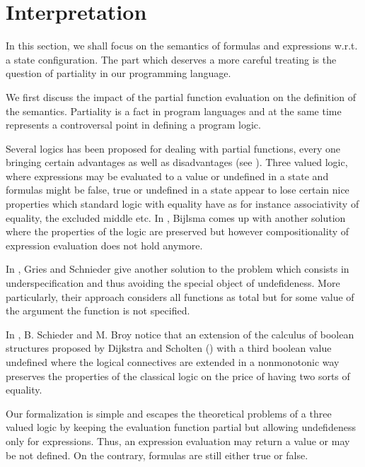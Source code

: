 

\newtheorem{interpExpr}{Definition}[subsection]
\newtheorem{interpTypeExpr}[interpExpr]{Definition} 
\newtheorem{interpPred}[interpExpr]{Definition}


\section{Interpretation}\label{interpret}

In this section, we shall focus on the semantics of formulas and expressions w.r.t. a state configuration.
The part which deserves a more  careful treating is the question of partiality in our programming language.

We first discuss  the impact of the partial function evaluation on the definition of the semantics. 
Partiality is   a  fact  in program languages and at the same time represents a
 controversal point in defining a program logic. 

 Several logics has been proposed for dealing with partial functions, 
every one bringing certain advantages as well as disadvantages (see \cite{gries95avoiding,schieder99adapting}).
Three valued logic, where expressions may be evaluated to a value or  undefined  in a state and
 formulas might be false, true or undefined in a state appear to lose certain nice properties
 which standard logic with equality have
as for instance associativity of equality, the excluded middle \cite{gries95avoiding} etc.
 In \cite{bijlsma90sqb}, Bijlsma comes up with another solution where the  properties of the logic are preserved but 
however compositionality of expression evaluation does not hold anymore.

In \cite{gries95avoiding}, Gries and Schnieder give another solution to the problem which consists in underspecification 
and thus  avoiding the special object of undefideness.
 More particularly, their approach considers all functions as total but for some value of the argument 
the function is not specified. 

In \cite{schieder99adapting},  B. Schieder and M. Broy notice that 
  an extension  of the calculus of boolean structures proposed by Dijkstra and Scholten (\cite{WPCDS}) with a  third boolean value 
undefined where  the logical connectives are extended in a nonmonotonic way preserves the properties of the classical logic
on the price  of having two sorts of equality. 

Our formalization is simple and escapes the theoretical problems of a three valued logic by keeping the evaluation function partial but
 allowing undefideness only for expressions.
Thus, an expression evaluation may return a value or may  be not defined. On the contrary, formulas are still either true or false.   


